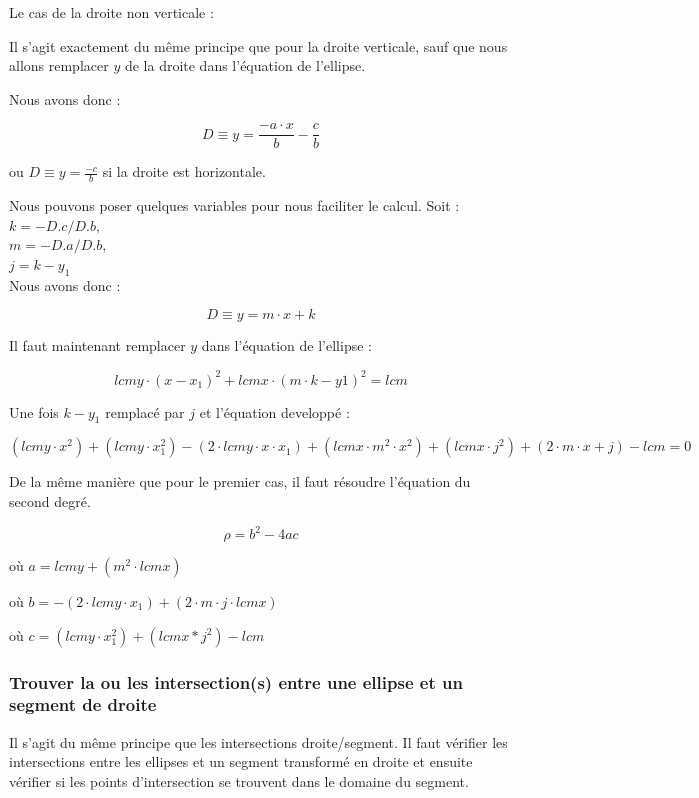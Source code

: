 \documentclass[]{report}
\begin{document}
Le cas de la droite non verticale : 

Il s'agit exactement du même principe que pour la droite verticale, sauf que nous 
allons remplacer $y$ de la droite dans l'équation de l'ellipse.

Nous avons donc : 

$$ D \equiv y = \frac{-a \cdot x}{b} - \frac{c}{b} $$

ou $ D \equiv y = \frac{-c}{b} $ si la droite est horizontale.

Nous pouvons poser quelques variables pour nous faciliter le calcul. Soit : \\
$k = -D.c / D.b $, \\
$m = -D.a / D.b $, \\
$j = k - y_1$      \\

Nous avons donc :

$$ D \equiv y = m \cdot x + k $$

Il faut maintenant remplacer $y$ dans l'équation de l'ellipse : 


$$ lcmy \cdot (x - x_1)^2 + lcmx \cdot (m \cdot k - y1)^2 = lcm $$

Une fois $k - y_1$ remplacé par $j$ et l'équation developpé : 

$$  (lcmy \cdot x^2) + (lcmy \cdot x_1^2) - (2 \cdot lcmy \cdot x \cdot x_1) + (lcmx \cdot m^2 \cdot x^2) + (lcmx \cdot j^2) + (2 \cdot m \cdot x + j) - lcm = 0 $$

De la même manière que pour le premier cas, il faut résoudre l'équation du second degré.

$$ \rho = b^2 - 4ac$$

\begin{description}
\item où $ a = lcmy + (m^2 \cdot lcmx) $ 
\item où $ b = -(2 \cdot lcmy \cdot x_1) + (2 \cdot m \cdot j \cdot lcmx) $
\item où $ c = (lcmy \cdot x_1^2) + (lcmx * j^2) - lcm $
\end{description}

\subsubsection{Trouver la ou les intersection(s) entre une ellipse et un segment de droite}

Il s'agit du même principe que les intersections droite/segment.
Il faut vérifier les intersections entre les ellipses et un segment
transformé en droite et ensuite vérifier si les points d'intersection
se trouvent dans le domaine du segment.
\end{document}
